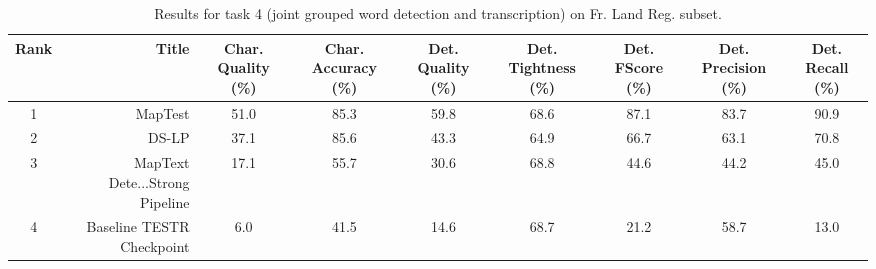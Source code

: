 \begin{table}
\caption{Results for task 4 (joint grouped word detection and transcription) on Fr. Land Reg. subset.}
\begin{tabular}{crccccccc}
\toprule
Rank & Title & Char. Quality (\%) & Char. Accuracy (\%) & Det. Quality (\%) & Det. Tightness (\%) & Det. FScore (\%) & Det. Precision (\%) & Det. Recall (\%) \\
\midrule
1 & MapTest & 51.0 & 85.3 & 59.8 & 68.6 & 87.1 & 83.7 & 90.9 \\
2 & DS-LP & 37.1 & 85.6 & 43.3 & 64.9 & 66.7 & 63.1 & 70.8 \\
3 & MapText Dete...Strong Pipeline & 17.1 & 55.7 & 30.6 & 68.8 & 44.6 & 44.2 & 45.0 \\
4 & Baseline TESTR Checkpoint & 6.0 & 41.5 & 14.6 & 68.7 & 21.2 & 58.7 & 13.0 \\
\bottomrule
\end{tabular}
\end{table}
